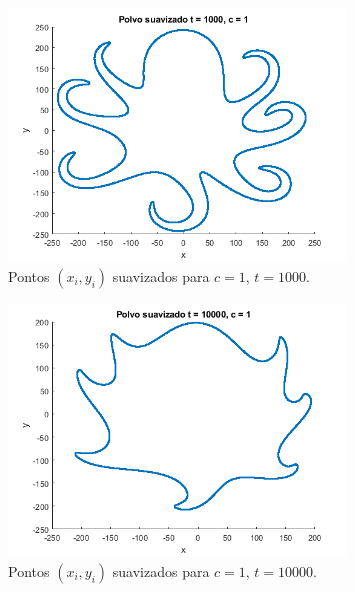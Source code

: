\documentclass{article}
\begin{document}
\begin{enumerate}
\begin{enumerate}
                        \begin{figure}[!h]
                            \centering
                            \includegraphics[width=0.8\textwidth]{t_1000.png}
                            \caption{Pontos $(x_i, y_i)$ suavizados para $c = 1$, $t = 1000$.}
                            \label{fig:t_1000}
                        \end{figure}

                        \begin{figure}[!h]
                            \centering
                            \includegraphics[width=0.8\textwidth]{t_10000.png}
                            \caption{Pontos $(x_i, y_i)$ suavizados para $c = 1$, $t = 10000$.}
                            \label{fig:t_10000}
                        \end{figure}


\end{enumerate}
\end{enumerate}
\end{document}

